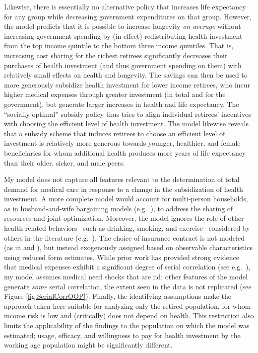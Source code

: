 \documentclass[12pt,pdftex,letterpaper]{article}
\begin{document}
Likewise, there is essentially no alternative policy that increases life expectancy for any group while decreasing government expenditures on that group.  However, the model predicts that it is possible to increase longevity \textit{on average} without increasing government spending by (in effect) redistributing health investment from the top income quintile to the bottom three income quintiles.  That is, increasing cost sharing for the richest retirees significantly decreases their purchases of health investment (and thus government spending on them) with relatively small effects on health and longevity.  The savings can then be used to more generously subsidize health investment for lower income retirees, who incur higher medical expenses through greater investment (in total and for the government), but generate larger increases in health and life expectancy. The ``socially optimal'' subsidy policy thus tries to align individual retirees' incentives with choosing the efficient level of health investment.  The model likewise reveals that a subsidy scheme that induces retirees to choose an efficient level of investment is relatively more generous towards younger, healthier, and female beneficiaries for whom additional health produces more years of life expectancy than their older, sicker, and male peers.

My model does not capture all features relevant to the determination of total demand for medical care in response to a change in the subsidization of health investment.  A more complete model would account for multi-person households, as in husband-and-wife bargaining models (e.g.\ \cite{blau06}), to address the sharing of resources and joint optimization.  Moreover, the model ignores the role of other health-related behaviors-- such as drinking, smoking, and exercise-- considered by others in the literature (e.g.\ \cite{khwaja10}).  The choice of insurance contract is not modeled (as in \cite{cardon01} and \cite{einav13}), but instead exogenously assigned based on observable characteristics using reduced form estimates.  While prior work has provided strong evidence that medical expenses exhibit a significant degree of serial correlation (see e.g.\ \cite{french04}), my model assumes medical need shocks that are iid; other features of the model generate \textit{some} serial correlation, the extent seen in the data is not replicated (see Figure \ref{fig:SerialCorrOOP}).  Finally, the identifying assumptions make the approach taken here suitable for analyzing only the retired population, for whom income risk is low and (critically) does not depend on health.  This restriction also limits the applicability of the findings to the population on which the model was estimated; usage, efficacy, and willingness to pay for health investment by the working age population might be significantly different.
\end{document}
